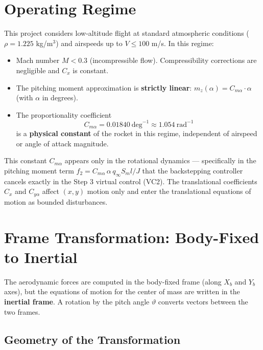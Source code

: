 \documentclass[11pt,a4paper]{article}
\begin{document}
\section{Operating Regime}

This project considers low-altitude flight at standard atmospheric conditions ($\rho = 1.225$ kg/m$^3$) and airspeeds up to $V \leq 100$ m/s. In this regime:

\begin{itemize}
  \item Mach number $M < 0.3$ (incompressible flow). Compressibility corrections are negligible and $C_x$ is constant.
  \item The pitching moment approximation is \textbf{strictly linear}: $m_z(\alpha) = C_{m\alpha}\cdot\alpha$ (with $\alpha$ in degrees).
  \item The proportionality coefficient
  \[
    C_{m\alpha} = 0.01840\ \text{deg}^{-1} \approx 1.054\ \text{rad}^{-1}
  \]
  is a \textbf{physical constant} of the rocket in this regime, independent of airspeed or angle of attack magnitude.
\end{itemize}

This constant $C_{m\alpha}$ appears only in the rotational dynamics --- specifically in the pitching moment term $f_2 = C_{m\alpha}\,\alpha\,q_\infty S_m l / J$ that the backstepping controller cancels exactly in the Step 3 virtual control (VC2). The translational coefficients $C_x$ and $C_{y\alpha}$ affect $(x, y)$ motion only and enter the translational equations of motion as bounded disturbances.

\section{Frame Transformation: Body-Fixed to Inertial}

The aerodynamic forces are computed in the body-fixed frame (along $X_b$ and $Y_b$ axes), but the equations of motion for the center of mass are written in the \textbf{inertial frame}. A rotation by the pitch angle $\vartheta$ converts vectors between the two frames.

\subsection{Geometry of the Transformation}
\end{document}
